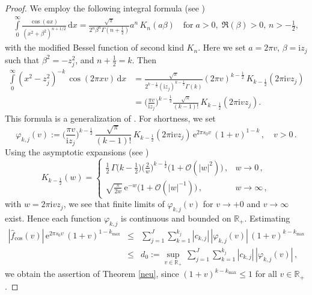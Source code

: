 \documentclass[11pt,a4paper]{scrartcl}
\renewcommand{\d}{\,\mathrm{d}}
\numberwithin{equation}{section}
\numberwithin{table}{section}
\numberwithin{figure}{section}
\newcommand{\e}{\mathrm e}
\renewcommand{\i}{\mathrm i}
\newcommand{\Rp}{{\mathbb R}_{+}}
\newcommand{\fcos}{{\hat f}_{\cos}}
\begin{document}
\begin{proof} We employ the following integral formula  (see \cite[Formula 3.773(8)]{GR82})
\begin{align}\label{eq:ratcosK} \textstyle \int\limits_{0}^{\infty} \frac{\cos(ax)}{(x^2+\beta^2)^{n+1/2}} \d x  = \frac{\sqrt{\pi}}{2^n\beta^n
\Gamma(n+\frac{1}{2})}  a^n \, K_n(a \beta) \quad \text{for} \; a>0, \; \Re(\beta)>0, \, n > -\frac{1}{2},
\end{align}
with the modified Bessel function of second kind $K_n$. Here we set $a=2\pi v$, $\beta= \i z_j$ such that $\beta^2 = -z_j^2$,
and $n+ \frac{1}{2} = k$. Then
\begin{align*}
\textstyle \int\limits_0^{\infty} (x^2-z_j^2)^{-k} \, \cos(2\pi xv) \d x &=
\textstyle \frac{\sqrt{\pi}}{2^{k - \frac{1}{2}} (\i z_j)^{k - \frac{1}{2}} \Gamma(k)}  (2\pi v)^{k - \frac{1}{2}} \,
K_{k- \frac{1}{2}}(2\pi \i v z_j)\\
&= \textstyle  \Big(\frac{\pi v}{\i z_j} \Big)^{k - \frac{1}{2}} \frac{\sqrt{\pi}}{(k-1)!}   \,
K_{k- \frac{1}{2}}(2\pi \i v z_j).
\end{align*}
This formula is a generalization of \cite[p.~8, Formula 2.7]{Ob90}.
For shortness, we set
$$
\textstyle \varphi_{k,j}(v) := \Big(\frac{\pi v}{\i z_j}\Big)^{k-\frac12}\,\frac{\sqrt\pi}{(k-1)!}\,
K_{k-\frac12}(2\pi\i v z_j)\,\e^{2\pi s_0 v}\,(1 + v)^{1-k}\,,\quad v > 0\,.
$$
Using the asymptotic expansions (see \cite[9.6.9 and 9.7.2]{AS72})
$$ \textstyle
K_{k-\frac12}(w) = \left\{\begin{array}{ll}
\frac{1}{2}\,\Gamma\big(k-\frac12\big)\big(\frac{2}{w}\big)^{k-\frac12}\big(1 + {\mathcal O}(|w|^2)\big)\,, & w \to 0\,,\\[1mm]
\sqrt{\frac{\pi}{2w}}\, \e^{-w}\big(1 + {\mathcal O}(|w|^{-1})\big)\,, & w \to \infty\,,
\end{array}\right.
$$
with $w = 2\pi\i v z_j$, we see that finite limits of $\varphi_{k,j}(v)$ for $v \to +0$ and
$v \to \infty$ exist. Hence each function $\varphi_{k,j}$ is continuous and bounded on $\Rp$.
Estimating
\begin{eqnarray*}
\textstyle
|\fcos(v)|\,\e^{2\pi s_0 v}\,(1+v)^{1-k_{\max}} &\leq& \sum\limits_{j=1}^J \sum\limits_{k=1}^{k_j} |c_{k,j}| \,|\varphi_{k,j}(v)|\, (1 + v)^{k- k_{\max}}\\
&\leq& d_0 := \sup\limits_{v\in \Rp}\, \sum\limits_{j=1}^J \sum\limits_{k=1}^{k_j} |c_{k,j}| \,|\varphi_{k,j}(v)|\,,
\end{eqnarray*}
we obtain the assertion of Theorem \ref{neu}, since $(1+v)^{k - k_{\max}} \leq 1$ for all $v \in \Rp$.
\end{proof}
\end{document}
